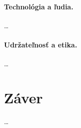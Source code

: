 \documentclass[10pt,slovak,a4paper]{article}
\begin{document}
\paragraph{Technológia a ľudia.}
\ldots

\paragraph{Udržateľnosť a etika.}
\ldots

\section{Záver}
\ldots


\end{document}
